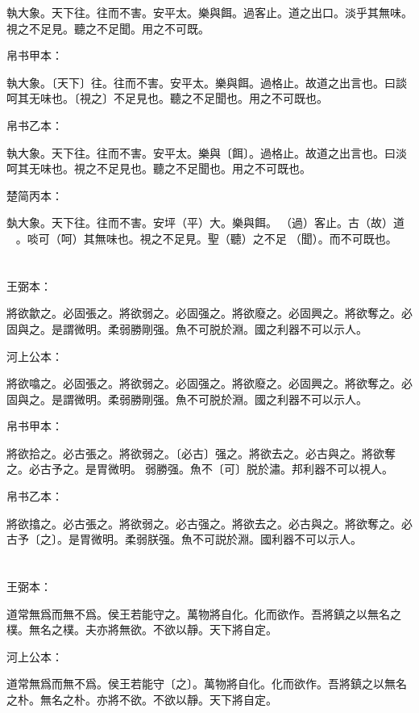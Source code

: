 \documentclass[a5paper]{ctexbook}
\begin{document}
    執大象。天下往。往而不害。安平太。樂與餌。過客止。道之出口。淡乎其無味。視之不足見。聽之不足聞。用之不可既。

    帛书甲本：

    執大象。〔天下〕往。往而不害。安平太。樂與餌。過格止。故道之出言也。曰談呵其无味也。〔視之〕不足見也。聽之不足聞也。用之不可既也。

    帛书乙本：

    執大象。天下往。往而不害。安平太。樂與〔餌〕。過格止。故道之出言也。曰淡呵其无味也。視之不足見也。聽之不足聞也。用之不可既也。

    楚简丙本：

    埶大象。天下往。往而不害。安坪（平）大。樂與餌。󶵨（過）客止。古（故）道☐☐☐。啖可（呵）其無味也。視之不足見。聖（聽）之不足𦖞（聞）。而不可既也。

    \chapter{}
    王弼本：

    將欲歙之。必固張之。將欲弱之。必固强之。將欲廢之。必固興之。將欲奪之。必固與之。是謂微明。柔弱勝剛强。魚不可脱於淵。國之利器不可以示人。

    河上公本：

    將欲噏之。必固張之。將欲弱之。必固强之。將欲廢之。必固興之。將欲奪之。必固與之。是謂微明。柔弱勝剛强。魚不可脱於淵。國之利器不可以示人。

    帛书甲本：

    將欲拾之。必古張之。將欲弱之。〔必古〕强之。將欲去之。必古與之。將欲奪之。必古予之。是胃微明。󱁩弱勝强。魚不〔可〕脱於潚。邦利器不可以視人。

    帛书乙本：

    將欲㩉之。必古張之。將欲弱之。必古强之。將欲去之。必古與之。將欲奪之。必古予〔之〕。是胃微明。柔弱朕强。魚不可説於淵。國利器不可以示人。

    \chapter{}
    王弼本：

    道常無爲而無不爲。侯王若能守之。萬物將自化。化而欲作。吾將鎮之以無名之樸。無名之樸。夫亦將無欲。不欲以靜。天下將自定。

    河上公本：

    道常無爲而無不爲。侯王若能守〔之〕。萬物將自化。化而欲作。吾將鎮之以無名之朴。無名之朴。亦將不欲。不欲以靜。天下將自定。
\end{document}
